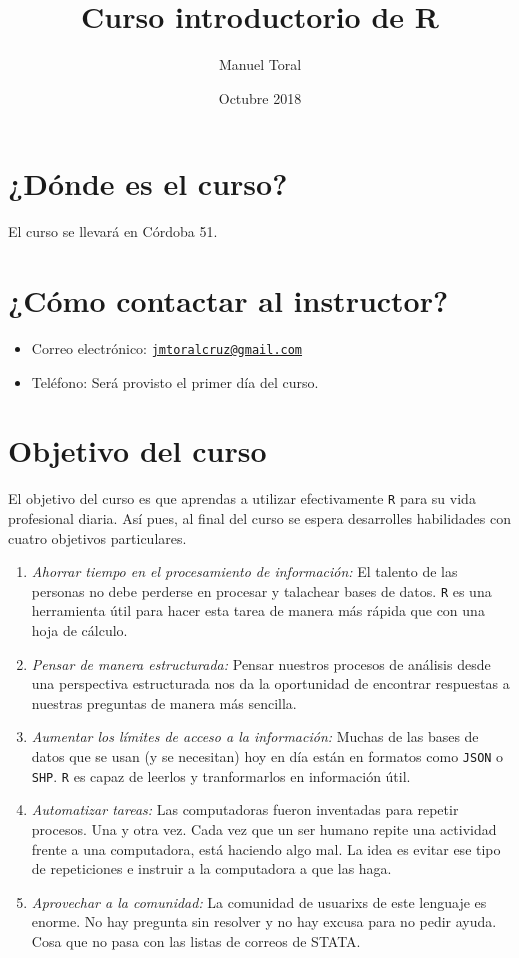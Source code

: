 \documentclass[]{article}
\title{Curso introductorio de R}
\author{Manuel Toral}
\date{Octubre 2018}
\providecommand{\tightlist}{%
  \setlength{\itemsep}{0pt}\setlength{\parskip}{0pt}}
\begin{document}
\maketitle

\section{¿Dónde es el curso?}\label{donde-es-el-curso}

El curso se llevará en Córdoba 51.

\section{¿Cómo contactar al
instructor?}\label{como-contactar-al-instructor}

\begin{itemize}
\tightlist
\item
  Correo electrónico:
  \href{mailto:jmtoralcruz@gmail.com}{\nolinkurl{jmtoralcruz@gmail.com}}
\item
  Teléfono: Será provisto el primer día del curso.
\end{itemize}

\section{Objetivo del curso}\label{objetivo-del-curso}

El objetivo del curso es que aprendas a utilizar efectivamente
\texttt{R} para su vida profesional diaria. Así pues, al final del curso
se espera desarrolles habilidades con cuatro objetivos particulares.

\begin{enumerate}
\def\labelenumi{\arabic{enumi}.}
\item
  \emph{Ahorrar tiempo en el procesamiento de información:} El talento
  de las personas no debe perderse en procesar y talachear bases de
  datos. \texttt{R} es una herramienta útil para hacer esta tarea de
  manera más rápida que con una hoja de cálculo.
\item
  \emph{Pensar de manera estructurada:} Pensar nuestros procesos de
  análisis desde una perspectiva estructurada nos da la oportunidad de
  encontrar respuestas a nuestras preguntas de manera más sencilla.
\item
  \emph{Aumentar los límites de acceso a la información:} Muchas de las
  bases de datos que se usan (y se necesitan) hoy en día están en
  formatos como \texttt{JSON} o \texttt{SHP}. \texttt{R} es capaz de
  leerlos y tranformarlos en información útil.
\item
  \emph{Automatizar tareas:} Las computadoras fueron inventadas para
  repetir procesos. Una y otra vez. Cada vez que un ser humano repite
  una actividad frente a una computadora, está haciendo algo mal. La
  idea es evitar ese tipo de repeticiones e instruir a la computadora a
  que las haga.
\item
  \emph{Aprovechar a la comunidad:} La comunidad de usuarixs de este
  lenguaje es enorme. No hay pregunta sin resolver y no hay excusa para
  no pedir ayuda. Cosa que no pasa con las listas de correos de STATA.
\end{enumerate}
\end{document}
